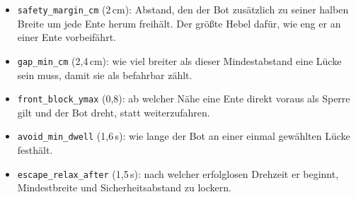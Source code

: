 \documentclass[10pt,a4paper]{article}
\begin{document}
\begin{itemize}
  \itemsep0.2ex
  \item \texttt{safety\_margin\_cm} (2\,cm): Abstand, den der Bot zusätzlich zu
        seiner halben Breite um jede Ente herum freihält. Der größte Hebel
        dafür, wie eng er an einer Ente vorbeifährt.
  \item \texttt{gap\_min\_cm} (2,4\,cm): wie viel breiter als dieser
        Mindestabstand eine Lücke sein muss, damit sie als befahrbar zählt.
  \item \texttt{front\_block\_ymax} (0,8): ab welcher Nähe eine Ente direkt
        voraus als Sperre gilt und der Bot dreht, statt weiterzufahren.
  \item \texttt{avoid\_min\_dwell} (1,6\,s): wie lange der Bot an einer einmal
        gewählten Lücke festhält.
  \item \texttt{escape\_relax\_after} (1,5\,s): nach welcher erfolglosen Drehzeit
        er beginnt, Mindestbreite und Sicherheitsabstand zu lockern.
\end{itemize}
\end{document}
